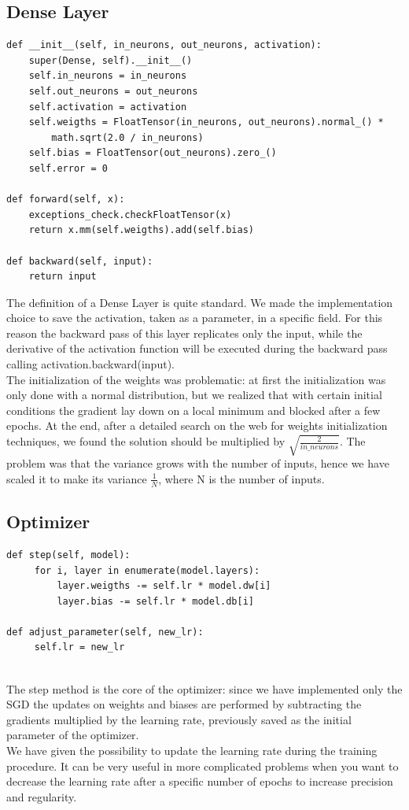 \subsection{Dense Layer}
\label{sect:Dense}
\begin{verbatim}
def __init__(self, in_neurons, out_neurons, activation):
    super(Dense, self).__init__()
    self.in_neurons = in_neurons
    self.out_neurons = out_neurons
    self.activation = activation
    self.weigths = FloatTensor(in_neurons, out_neurons).normal_() * 
	    math.sqrt(2.0 / in_neurons)
    self.bias = FloatTensor(out_neurons).zero_()
    self.error = 0
    
def forward(self, x):
    exceptions_check.checkFloatTensor(x)
    return x.mm(self.weigths).add(self.bias)
    
def backward(self, input):
    return input
\end{verbatim}
The definition of a Dense Layer is quite standard. We made the implementation choice to save the activation, taken as a parameter, in a specific field. For this reason the backward pass of this layer replicates only the input, while the derivative of the activation function will be executed during the backward pass calling activation.backward(input). \\
The initialization of the weights was problematic: at first the initialization was only done with a normal distribution, but we realized that with certain initial conditions the gradient lay down on a local minimum and blocked after a few epochs. At the end, after a detailed search on the web for weights initialization techniques, we found the solution should be multiplied by $\sqrt{\frac{2}{in\_neurons}}$. The problem was that the variance grows with the number of inputs, hence we have scaled it to make its variance $ \frac{1}{N} $, where N is the number of inputs.

\subsection{Optimizer}
\label{sect:Optimizer}

\begin{verbatim}
def step(self, model):
	 for i, layer in enumerate(model.layers):
		 layer.weigths -= self.lr * model.dw[i] 
		 layer.bias -= self.lr * model.db[i]
		 
def adjust_parameter(self, new_lr):
	 self.lr = new_lr
		 
\end{verbatim}
The step method is the core of the optimizer: since we have implemented only the SGD the updates on weights and biases are performed by subtracting the gradients multiplied by the learning rate, previously saved as the initial parameter of the optimizer. \\
We have given the possibility to update the learning rate during the training procedure. It can be very useful in more complicated problems when you want to decrease the learning rate after a specific number of epochs to increase precision and regularity.

